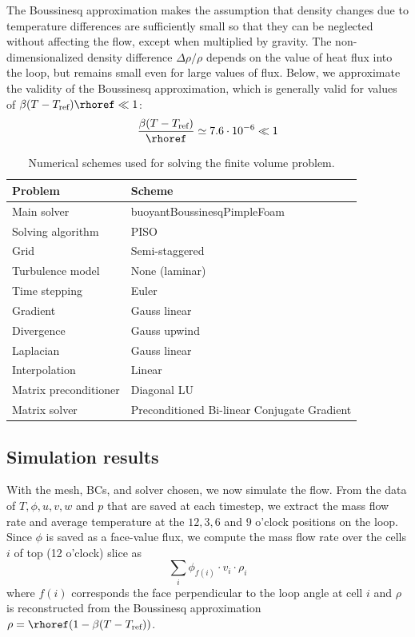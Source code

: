 The Boussinesq approximation makes the assumption that density changes due to temperature differences are sufficiently small so that they can be neglected without affecting the flow, except when multiplied by gravity.
The non-dimensionalized density difference $\Delta \rho / \rho$ depends on the value of heat flux into the loop, but remains small even for large values of flux.
Below, we approximate the validity of the Boussinesq approximation, which is generally valid for values of $\beta(T-T_\text{ref})\rhoref \ll 1$:
\begin{equation} \frac{\beta(T - T_\text{ref})}{\rhoref} \simeq 7.6 \cdot 10^{-6} \ll 1 \label{eq:bouss} \end{equation}

\begin{table}
\begin{center}
\begin{tabular}{ll}
\hline
Problem & Scheme\\
\hline
\hline
Main solver & buoyantBoussinesqPimpleFoam\\
\hline
Solving algorithm & PISO\\
\hline
Grid & Semi-staggered\\
\hline
Turbulence model & None (laminar)\\
\hline
Time stepping & Euler\\
\hline
Gradient & Gauss linear\\
\hline
Divergence & Gauss upwind\\
\hline
Laplacian & Gauss linear\\
\hline
Interpolation & Linear\\
\hline
Matrix preconditioner & Diagonal LU\\
\hline
Matrix solver & Preconditioned Bi-linear Conjugate Gradient\\
\hline
\end{tabular}
\caption[Numerical schemes used for solving the finite volume problem]{
  Numerical schemes used for solving the finite volume problem.
  }
\label{tb:ofsolution}
\end{center}
\end{table}

\subsection{Simulation results}
With the mesh, BCs, and solver chosen, we now simulate the flow.
From the data of $T,\phi,u,v,w$ and $p$ that are saved at each timestep, we extract the mass flow rate and average temperature at the $12,3,6$ and $9$ o'clock positions on the loop.
Since $\phi$ is saved as a face-value flux, we compute the mass flow rate over the cells $i$ of top (12 o'clock) slice as
\begin{equation} \sum _i\phi_{f(i)} \cdot v_i \cdot \rho_i\end{equation}
where $f(i)$ corresponds the face perpendicular to the loop angle at cell $i$ and $\rho$ is reconstructed from the Boussinesq approximation $\rho = \rhoref (1-\beta(T-T_\text{ref}))$.

